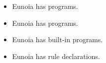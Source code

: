 \documentclass[lualatex, compress, 12pt, handout]{beamer}
\begin{document}
\begin{frame}
	\begin{itemize}
		\item<+-> Eunoia has programs.
	\end{itemize}
\end{frame}


\begin{frame}
	\begin{itemize}
		\item<+-> Eunoia has programs.
	\end{itemize}
\end{frame}

\begin{frame}
	\begin{itemize}
		\item<+-> Eunoia has built-in programs.
	\end{itemize}
\end{frame}

\begin{frame}
	\begin{itemize}
		\item<+-> Eunoia has rule declarations.
	\end{itemize}
\end{frame}


\end{document}
